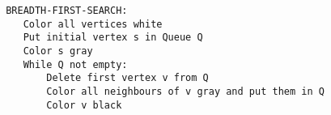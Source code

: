 \documentclass{article}
\begin{document}
\begin{lstlisting}
 BREADTH-FIRST-SEARCH:
    Color all vertices white
    Put initial vertex s in Queue Q
    Color s gray
    While Q not empty:
        Delete first vertex v from Q
        Color all neighbours of v gray and put them in Q
        Color v black
\end{lstlisting}

\lstset{firstnumber=1}


\end{document}
